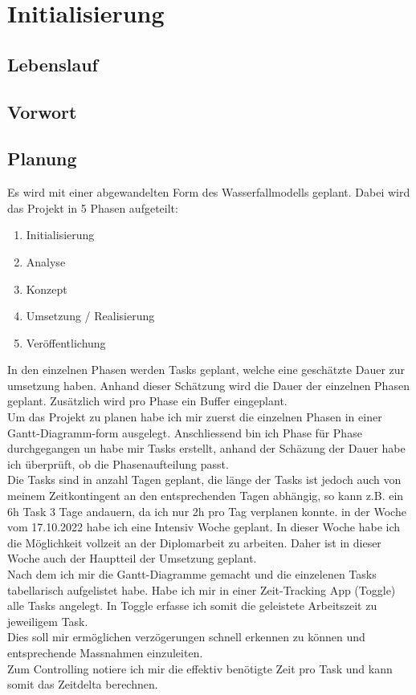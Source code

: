 \section{Initialisierung}
\newpage
\subsection{Lebenslauf}
\newpage
\subsection{Vorwort}
\newpage
\subsection{Planung}

Es wird mit einer abgewandelten Form des Wasserfallmodells geplant.
Dabei wird das Projekt in 5 Phasen aufgeteilt: \\
\begin{enumerate}
  \item Initialisierung
  \item Analyse
  \item Konzept
  \item Umsetzung / Realisierung
  \item Veröffentlichung
\end{enumerate}
\vspace{1cm}
In den einzelnen Phasen werden Tasks geplant, welche eine geschätzte Dauer zur umsetzung haben.
Anhand dieser Schätzung wird die Dauer der einzelnen Phasen geplant. Zusätzlich wird pro Phase ein Buffer eingeplant.
\vspace{0.5cm}\\
Um das Projekt zu planen habe ich mir zuerst die einzelnen Phasen in einer Gantt-Diagramm-form ausgelegt.
Anschliessend bin ich Phase für Phase durchgegangen un habe mir Tasks erstellt, anhand der Schäzung der Dauer habe ich überprüft,
ob die Phasenaufteilung passt.\\
Die Tasks sind in anzahl Tagen geplant, die länge der Tasks ist jedoch auch von meinem Zeitkontingent an den entsprechenden Tagen abhängig,
so kann z.B. ein 6h Task 3 Tage andauern, da ich nur 2h pro Tag verplanen konnte.
in der Woche vom 17.10.2022 habe ich eine Intensiv Woche geplant. In dieser Woche habe ich die Möglichkeit vollzeit an der Diplomarbeit zu arbeiten.
Daher ist in dieser Woche auch der Hauptteil der Umsetzung geplant.\\
Nach dem ich mir die Gantt-Diagramme gemacht und die einzelenen Tasks tabellarisch aufgelistet habe. 
Habe ich mir in einer Zeit-Tracking App (Toggle) alle Tasks angelegt. In Toggle erfasse ich somit die geleistete Arbeitszeit zu jeweiligem Task.\\
Dies soll mir ermöglichen verzögerungen schnell erkennen zu können und entsprechende Massnahmen einzuleiten.\\
Zum Controlling notiere ich mir die effektiv benötigte Zeit pro Task und kann somit das Zeitdelta berechnen.
\newpage
